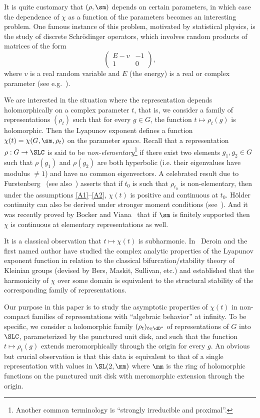 It is quite customary that $(\rho, \sm)$ depends on certain parameters, in which case the dependence of $\chi$ as a function of the parameters becomes an interesting problem. One famous instance of this problem, motivated by statistical physics, is the study of discrete Schr\"odinger operators, which involves random products of matrices of the form
\[
\begin{pmatrix} E-v & -1 \\ 1 & 0
\end{pmatrix},
\]
where $v$ is a real random variable and $E$ (the energy) is a real or complex parameter
(see e.g.~\cite{bougerol-lacroix}).


We are interested in the situation where the representation depends holomorphically on a complex parameter $t$, that is, we consider a family of representations $(\rho_t)$ such that for every $g\in G$, the function $t\mapsto \rho_t(g)$ is holomorphic. Then the Lyapunov exponent defines a function $\chi(t) = \chi(G, \sm, \rho_t)$ on the parameter space. Recall that a representation $\rho: G \to \SLC$ is said to be \emph{non-elementary}\footnote{Another common terminology is ``strongly irreducible and proximal''.} if there exist two elements $g_1, g_2 \in G$ such that $\rho(g_1)$ and $\rho(g_2)$ are both hyperbolic (i.e. their eigenvalues have modulus $\neq 1$) and have no common eigenvectors. A celebrated result due to Furstenberg~\cite{furstenberg} (see also~\cite{furstenberg-kifer}) asserts that if $t_0$ is such that $\rho_{t_0}$ is non-elementary, then under the assumptions \eqref{A1}--\eqref{A2}, $\chi(t)$ is positive and continuous at $t_0$. H\"older continuity can also be derived under stronger moment conditions (see~\cite{lepage-holder}). And it was recently proved by Bocker and Viana~\cite{bocker-viana} that if $\sm$ is finitely supported then $\chi$ is continuous at elementary representations as well.

It is a classical observation that $t\mapsto \chi(t)$ is subharmonic. In~\cite{kleinbif, bers1} Deroin and the first named author have studied the complex analytic properties of the Lyapunov exponent function in relation to the classical bifurcation/stability theory of Kleinian groups (devised by Bers, Maskit, Sullivan, etc.) and established that the harmonicity of $\chi$ over some domain is equivalent to the structural stability of the corresponding family of representations.


Our purpose in this paper is to study the asymptotic properties of $\chi(t)$ in non-compact families of representations with ``algebraic behavior'' at infinity. To be specific, we consider a holomorphic family $(\rho_t)_{t\in \dD^*}$ of representations of $G$ into $\SLC$, parameterized by the punctured unit disk, and such that the function $t\mapsto \rho_t(g)$ extends meromorphically through the origin for every $g$. An obvious but crucial observation is that this data is equivalent to that of a single representation with values in $\SL(2, \mm)$ where $\mm$ is the ring of holomorphic functions on the punctured unit disk with meromorphic extension through the origin.

